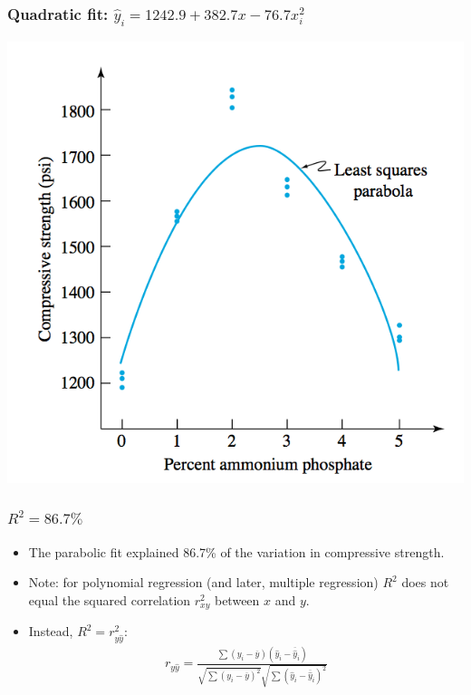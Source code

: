 \documentclass[handout]{beamer}
\providecommand{\ov}[1]{\overline{#1}}
\providecommand{\wh}[1]{\widehat{#1}}
\numberwithin{equation}{section}
\begin{document}
\begin{frame}
\frametitle{Quadratic fit: $\wh{y}_i = 1242.9 + 382.7x - 76.7x_i^2$}
 \includegraphics{../../fig/flyashquadfitfit.png}
\end{frame}

\begin{frame}
\frametitle{$R^2 = 86.7\%$}
\begin{itemize}
\pause \item The parabolic fit explained 86.7\% of the variation in compressive strength. 
\pause \item Note: for polynomial regression (and later, multiple regression) $R^2$ does not equal the squared correlation $r_{xy}^2$ between $x$ and $y$. 
\pause \item Instead, $R^2 = r_{y \wh{y}}^2$: 
\pause \begin{align*}
 r_{y \wh{y}} = \frac{\sum(y_i - \ov{y})(\wh{y}_i - \ov{\wh{y}}_i)}{\sqrt{\sum (y_i - \ov{y})^2}\sqrt{\sum (\wh{y}_i - \ov{\wh{y}}_i)^2}}
\end{align*}
\end{itemize}
\end{frame}
\end{document}
